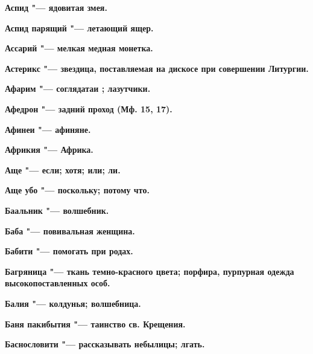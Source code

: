 \bfseries Аспид \normalfont{} "--- ядовитая змея. 




\bfseries Аспид парящий \normalfont{} "--- летающий ящер. 




\bfseries Ассарий \normalfont{} "--- мелкая медная монетка. 




\bfseries Астерикс \normalfont{} "--- звездица, поставляемая на дискосе при совершении Литургии. 




\bfseries Афарим \normalfont{} "--- соглядатаи ; лазутчики. 




\bfseries Афедрон \normalfont{} "--- задний проход (Мф. 15, 17). 




\bfseries Афинеи \normalfont{} "--- афиняне. 




\bfseries Африкия \normalfont{} "--- Африка. 




\bfseries Аще \normalfont{} "--- если; хотя; или; ли. 




\bfseries Аще убо \normalfont{} "--- поскольку; потому что. 




 





\bfseries Баальник \normalfont{} "--- волшебник. 




\bfseries Баба \normalfont{} "--- повивальная женщина. 




\bfseries Бабити \normalfont{} "--- помогать при родах. 




\bfseries Багряница \normalfont{} "--- ткань темно-красного цвета; порфира, пурпурная одежда высокопоставленных особ. 




\bfseries Балия \normalfont{} "--- колдунья; волшебница. 




\bfseries Баня пакибытия \normalfont{} "--- таинство св. Крещения. 




\bfseries Баснословити \normalfont{} "--- рассказывать небылицы; лгать. 




